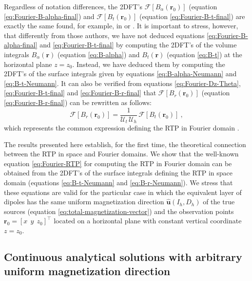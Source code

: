 Regardless of notation differences, the 2DFT's
$\mathcal{F}\left[ B_{\alpha}(\mathbf{r}_{0}) \right]$ 
(equation \ref{eq:Fourier-B-alpha-final}) and 
$\mathcal{F}\left[ B_{t}(\mathbf{r}_{0}) \right]$ (equation \ref{eq:Fourier-B-t-final})
are exactly the same found, for example, in \citet{gunn1975} or 
\citet[][ p. 298]{blakely1996}.
It is important to stress, however, that differently from those authors, 
we have not deduced equations \ref{eq:Fourier-B-alpha-final} 
and \ref{eq:Fourier-B-t-final} by computing the 2DFT's of the volume integrals 
$B_{\alpha}(\mathbf{r})$ (equation \ref{eq:B-alpha}) and 
$B_{t}(\mathbf{r})$ (equation \ref{eq:B-t}) at the horizontal plane $z = z_{0}$. 
Instead, we have deduced them by computing the 2DFT's of the surface integrals
given by equations \ref{eq:B-alpha-Neumann} and \ref{eq:B-t-Neumann}.
It can also be verified from equations 
\ref{eq:Fourier-Dz-Theta}, \ref{eq:Fourier-B-t-final} and 
\ref{eq:Fourier-B-r-final} that $\mathcal{F}\left[ B_{r}(\mathbf{r}_{0}) \right]$ 
(equation \ref{eq:Fourier-B-r-final}) can be rewritten as follows:
\begin{equation}
\mathcal{F}\left[ B_{r}(\mathbf{r}_{0}) \right]
= \frac{1}{\mathcal{U}_{t} \,\mathcal{U}_{h}} \, 
\mathcal{F}\left[ B_{t}(\mathbf{r}_{0}) \right] \: ,
\label{eq:Fourier-RTP}
\end{equation}
which represents the common expression defining the RTP in Fourier domain
\cite[e.g.,][ p. 331]{blakely1996}.

The results presented here establish, for the first time, 
the theoretical connection between the RTP in space and Fourier domains.
We show that the well-known equation \ref{eq:Fourier-RTP} for computing the
RTP in Fourier domain can be obtained from the 2DFT's of the surface integrals
defining the RTP in space domain (equations \ref{eq:B-t-Neumann} and \ref{eq:B-r-Neumann}).
We stress that these equations are valid for the particular case in which the
equivalent layer of dipoles has the same uniform magnetization direction
$\hat{\mathbf{u}}(I_{h}, D_{h})$ of the true sources 
(equation \ref{eq:total-magnetization-vector}) and the observation points 
$\mathbf{r}_{0} = \left[x \:\: y \:\: z_{0} \right]^{\top}$ 
located on a horizontal plane with constant vertical coordinate $z = z_{0}$.


\subsection{Continuous analytical solutions with arbitrary uniform magnetization direction}
\label{subsec:arbitrary_mag}


